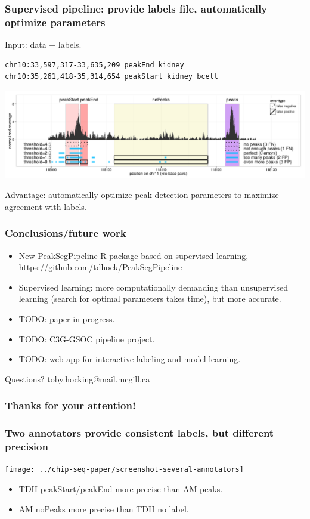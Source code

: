 \documentclass{beamer}
\begin{document}
\begin{frame}[fragile]
  \frametitle{Supervised pipeline: 
provide labels file, automatically optimize parameters}
  Input: data + labels.
  \begin{verbatim}
chr10:33,597,317-33,635,209 peakEnd kidney
chr10:35,261,418-35,314,654 peakStart kidney bcell
\end{verbatim}

  \includegraphics[width=\textwidth]{figure-PeakError.pdf}

  Advantage: automatically optimize peak detection parameters to
  maximize agreement with labels.

\end{frame}

\begin{frame}
  \frametitle{Conclusions/future work}
  \begin{itemize}
  \item New PeakSegPipeline R package based on supervised learning,
    \url{https://github.com/tdhock/PeakSegPipeline}
  \item Supervised learning: more computationally demanding than
    unsupervised learning (search for optimal parameters takes time),
    but more accurate.
  \item TODO: paper in progress.
  \item TODO: C3G-GSOC pipeline project.
  \item TODO: web app for interactive labeling and model learning.
  \end{itemize}

  Questions? toby.hocking@mail.mcgill.ca
\end{frame}

\begin{frame}
  \frametitle{Thanks for your attention!}


\end{frame}

\begin{frame}
  \frametitle{Two annotators provide consistent labels, but different
    precision}
  \texttt{[image: ../chip-seq-paper/screenshot-several-annotators]}

  \begin{itemize}
  \item TDH peakStart/peakEnd more precise than AM peaks.
  \item AM noPeaks more precise than TDH no label.
  \end{itemize}
\end{frame}
\end{document}
